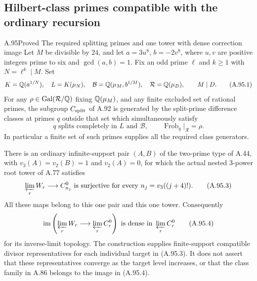 \subsection{Hilbert-class primes compatible with the ordinary recursion}

\begin{statement}{A.95}{Proved}
{The required splitting primes and one tower with dense correction image}
Let $M$ be divisible by $24$, and let
$a=3u^8$, $b=-2v^8$, where $u,v$ are positive integers prime
to six and $\gcd(a,b)=1$.
Fix an odd prime $\ell$ and $k\ge1$ with $N=\ell^k\mid M$.
Set
\[
 K=\mathbb Q(a^{1/N}),\quad L=K(\mu_N),\quad
 \mathcal B=\mathbb Q(\mu_M,b^{1/M}),\quad
 \mathcal R=\mathbb Q(\mu_D),\qquad M\mid D.
 \tag{A.95.1}
\]
For any $\rho\in\operatorname{Gal}(\mathcal R/\mathbb Q)$ fixing
$\mathbb Q(\mu_M)$, and any finite excluded set of rational primes,
the subgroup $C_{\rm split}$ of A.92 is generated by the
split-prime difference classes at primes $q$ outside that set
which simultaneously satisfy
\[
 q\text{ splits completely in }L\text{ and }\mathcal B,
       \qquad \operatorname{Frob}_q|_{\mathcal R}=\rho.
 \tag{A.95.2}
\]
In particular a finite set of such primes supplies all the
required class generators.

There is an ordinary infinite-support pair $(A,B)$ of the
two-prime type of A.44, with $v_3(A)=v_2(B)=1$ and $v_2(A)=0$,
for which the actual nested $3$-power root tower of A.77
satisfies
\[
 \varprojlim_r W_r\longrightarrow C_{n_j}^0
       \text{ is surjective for every }n_j=v_3((j+4)!).
 \tag{A.95.3}
\]
All these maps belong to this one pair and this one tower.
Consequently
\[
 \operatorname{im}\left(\varprojlim_r W_r
                   \longrightarrow\varprojlim_r C_r^0\right)
       \text{ is dense in }\varprojlim_r C_r^0
 \tag{A.95.4}
\]
for its inverse-limit topology.  The construction supplies
finite-support compatible divisor representatives for each
individual target in (A.95.3).
It does not assert that these representatives converge as
the target level increases, or that the class family in A.86
belongs to the image in (A.95.4).
\end{statement}
